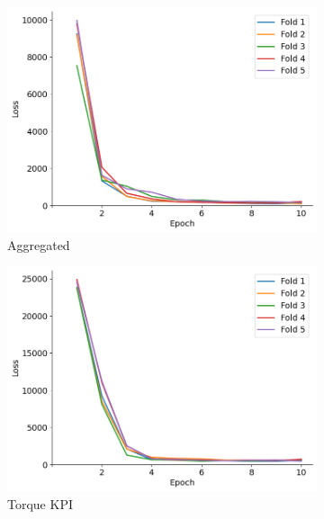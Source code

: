 \documentclass{report} %
\begin{document}
\begin{figure}[H]
    \centering
    \begin{subfigure}{0.32\textwidth}
        \centering
        \includegraphics[width=\textwidth]{./ReportImages/train_loss.png}
        \caption{\centering Aggregated}
        \label{fig:Aggregated Training Loss}
    \end{subfigure}\hfill
    \begin{subfigure}{0.32\textwidth}
        \centering
        \includegraphics[width=\textwidth]{./ReportImages/train_loss_y1.png}
        \caption{\centering Torque \ac{KPI}}
        \label{fig:Training Loss for Torque Curve}
    \end{subfigure}\hfill
    \begin{subfigure}{0.32\textwidth}

\end{subfigure}
\end{figure}
\end{document}
